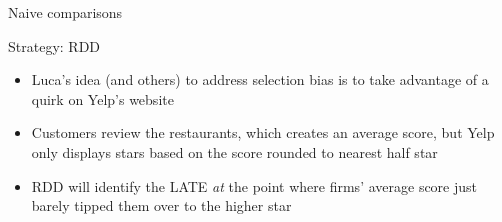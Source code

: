 \documentclass{beamer}
\begin{document}
\begin{frame}{Naive comparisons}
	
	\begin{figure}
	\end{figure}

	
	
\end{frame}



\begin{frame}{Strategy: RDD}

\begin{itemize}

\item Luca's idea (and others) to address selection bias is to take advantage of a quirk on Yelp's website
\item Customers review the restaurants, which creates an average score, but Yelp only displays stars based on the score rounded to nearest half star
\item RDD will identify the LATE \emph{at} the point where firms' average score just barely tipped them over to the higher star

\end{itemize}

\end{frame}
\end{document}
